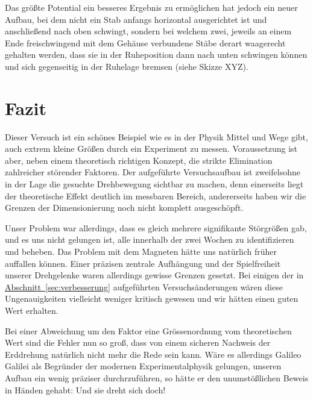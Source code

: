 \documentclass[11pt]{scrartcl}
\newcommand{\hypref}[2]{\hyperref[#2]{{#1}~\ref{#2}}}
\begin{document}
Das größte Potential ein besseres Ergebnis zu ermöglichen hat jedoch ein neuer Aufbau, bei dem nicht ein Stab anfangs horizontal ausgerichtet ist und anschließend nach oben schwingt, sondern bei welchem zwei, jeweils an einem Ende freischwingend mit dem Gehäuse verbundene Stäbe derart waagerecht gehalten werden, dass sie in der Ruheposition dann nach unten schwingen können und sich gegenseitig in der Ruhelage bremsen (siehe Skizze XYZ).


\section{Fazit} %
Dieser Versuch ist ein schönes Beispiel wie es in der Physik Mittel und Wege gibt, auch extrem kleine Größen durch ein Experiment zu messen.
Voraussetzung ist aber, neben einem theoretisch richtigen Konzept, die strikte Elimination zahlreicher störender Faktoren.
Der aufgeführte Versuchsaufbau ist zweifelsohne in der Lage die gesuchte Drehbewegung sichtbar zu machen, denn einerseits liegt der theoretische Effekt deutlich im messbaren Bereich, andererseits haben wir die Grenzen der Dimensionierung noch nicht komplett ausgeschöpft.

Unser Problem war allerdings, dass es gleich mehrere signifikante Störgrößen gab, und es uns nicht gelungen ist, alle innerhalb der zwei Wochen zu identifizieren und beheben.
Das Problem mit dem Magneten hätte uns natürlich früher auffallen können.
Einer präzisen zentrale Aufhängung und der Spielfreiheit unserer Drehgelenke waren allerdings gewisse Grenzen gesetzt.
Bei einigen der in \hypref{Abschnitt}{sec:verbesserung} aufgeführten Versuchsänderungen wären diese Ungenauigkeiten vielleicht weniger kritisch gewesen und wir hätten einen guten Wert erhalten.

Bei einer Abweichung um den Faktor eine Gr\"ossenordnung vom theoretischen Wert sind die Fehler nun so groß, dass von einem sicheren Nachweis der Erddrehung natürlich nicht mehr die Rede sein kann.
Wäre es allerdings Galileo Galilei als Begründer der modernen Experimentalphysik gelungen, unseren Aufbau ein wenig präziser durchrzuführen, so hätte er den unumstößlichen Beweis in Händen gehabt:
Und sie dreht sich doch!
\end{document}
